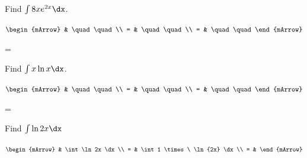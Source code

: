 \clearpage\noindent%
\begin{mtask}[resume]
   \task \begin{exercise} Find $\int 8x e^{2x} \dx$.
           \begin{envSolution}[height=10cm]
             $\begin{mArrow}
                   & \quad \quad              \\
		   		 = & \quad \quad              \\
				 = & \quad \quad 
              \end{mArrow}$
            \begin{shortsolution}  
			     =$ \quad \quad \quad \quad$
			\end{shortsolution}				 
           \end{envSolution}
         \end{exercise}
   \task \begin{exercise} Find $\int x \ln{x} \dx$.
           \begin{envSolution}[height=10cm]
             $\begin{mArrow}
                   & \quad \quad              \\
		   		 = & \quad \quad              \\
				 = & \quad \quad 
              \end{mArrow}$
            \begin{shortsolution}  
			     =$ \quad \quad \quad \quad$
			\end{shortsolution}				 
           \end{envSolution}
         \end{exercise}

		 
   \task \begin{exercise} Find $\int \ln{2x} \dx$
           \begin{envSolution}
             $\begin{mArrow}
                   & \int \ln2x \dx              \\
		   		 = & \int 1 \times \ \ln{2x} \dx              \\
				 = &  
              \end{mArrow}$
            \begin{shortsolution}  
			     $\quad \quad$
			\end{shortsolution}				 
           \end{envSolution}
         \end{exercise}




\end{mtask}
